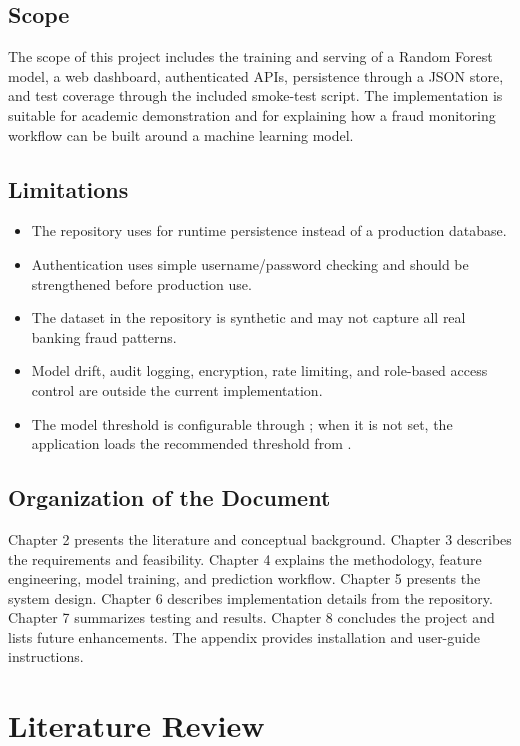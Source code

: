 \documentclass[12pt,a4paper]{report}
\begin{document}
\section{Scope}
The scope of this project includes the training and serving of a Random Forest model, a web dashboard, authenticated APIs, persistence through a JSON store, and test coverage through the included smoke-test script. The implementation is suitable for academic demonstration and for explaining how a fraud monitoring workflow can be built around a machine learning model.

\section{Limitations}
\begin{itemize}
    \item The repository uses  for runtime persistence instead of a production database.
    \item Authentication uses simple username/password checking and should be strengthened before production use.
    \item The dataset in the repository is synthetic and may not capture all real banking fraud patterns.
    \item Model drift, audit logging, encryption, rate limiting, and role-based access control are outside the current implementation.
    \item The model threshold is configurable through ; when it is not set, the application loads the recommended threshold from .
\end{itemize}

\section{Organization of the Document}
Chapter 2 presents the literature and conceptual background. Chapter 3 describes the requirements and feasibility. Chapter 4 explains the methodology, feature engineering, model training, and prediction workflow. Chapter 5 presents the system design. Chapter 6 describes implementation details from the repository. Chapter 7 summarizes testing and results. Chapter 8 concludes the project and lists future enhancements. The appendix provides installation and user-guide instructions.

\chapter{Literature Review}
\end{document}

